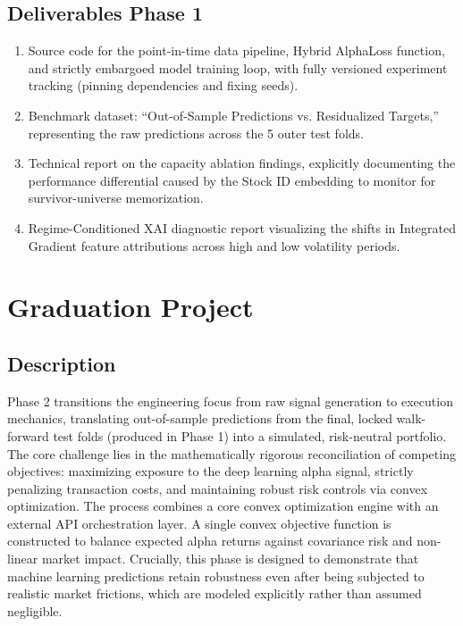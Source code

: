 \subsection*{Deliverables Phase 1}
\begin{enumerate}
    \item Source code for the point-in-time data pipeline, Hybrid AlphaLoss function, and strictly embargoed model training loop, with fully versioned experiment tracking (pinning dependencies and fixing seeds).
    \item Benchmark dataset: ``Out-of-Sample Predictions vs. Residualized Targets,'' representing the raw predictions across the 5 outer test folds.
    \item Technical report on the capacity ablation findings, explicitly documenting the performance differential caused by the Stock ID embedding to monitor for survivor-universe memorization.
    \item Regime-Conditioned \acs{XAI} diagnostic report visualizing the shifts in Integrated Gradient feature attributions across high and low volatility periods.
\end{enumerate}

\section{Graduation Project}
\subsection*{Description}
Phase 2 transitions the engineering focus from raw signal generation to execution mechanics, translating out-of-sample predictions from the final, locked walk-forward test folds (produced in Phase 1) into a simulated, risk-neutral portfolio. The core challenge lies in the mathematically rigorous reconciliation of competing objectives: maximizing exposure to the deep learning alpha signal, strictly penalizing transaction costs, and maintaining robust risk controls via convex optimization. The process combines a core convex optimization engine with an external \ac{API} orchestration layer. A single convex objective function is constructed to balance expected alpha returns against covariance risk and non-linear market impact. Crucially, this phase is designed to demonstrate that machine learning predictions retain robustness even after being subjected to realistic market frictions, which are modeled explicitly rather than assumed negligible.

